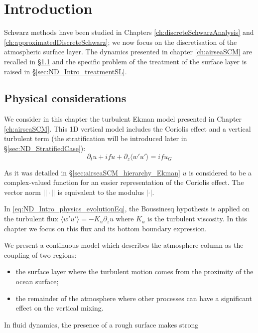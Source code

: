 \section{Introduction}
Schwarz methods have been studied in Chapters
\ref{ch:discreteSchwarzAnalysis} and
\ref{ch:approximatedDiscreteSchwarz}; we now focus
on the discretisation of the atmospheric surface layer.
The dynamics presented in chapter \ref{ch:airseaSCM} are
recalled in \S \ref{sec:ND_Intro_continuousModel} and
the specific problem of the treatment of the surface layer
is raised in \S \ref{sec:ND_Intro_treatmentSL}.
\subsection{Physical considerations}
\label{sec:ND_Intro_continuousModel}
We consider in this chapter the turbulent Ekman model presented
in Chapter \ref{ch:airseaSCM}.
This 1D vertical model includes the Coriolis effect
and a vertical turbulent term (the stratification
will be introduced later in \S\ref{sec:ND_StratifiedCase}):
\begin{equation}
	\label{eq:ND_Intro_physics_evolutionEq}
	\partial_t u + i f u + \partial_z \langle w'u'\rangle
	= i f u_G 
\end{equation}
\begin{remark}
As it was detailed in \S \ref{sec:airseaSCM_hierarchy_Ekman}
$u$ is considered to be a complex-valued function for an easier
representation of the Coriolis effect.
The vector norm $||\cdot||$ is equivalent to the modulus
$|\cdot|$.
\end{remark}
In \eqref{eq:ND_Intro_physics_evolutionEq}, the
Boussinesq hypothesis is applied on the turbulent flux
$\langle w'u' \rangle = - K_u \partial_z u$ where
$K_u$ is the turbulent viscosity.
In this chapter we focus on this flux and its bottom boundary
expression.
\par
We present a continuous model which describes the atmosphere
column as the coupling of two regions:
\begin{itemize}
		\item the surface layer where the turbulent motion
			comes from the proximity of the ocean surface;
		\item the remainder of the atmosphere where other
			processes can have a significant effect
			on the vertical mixing.
\end{itemize}
In fluid dynamics, the presence of a rough surface makes strong
